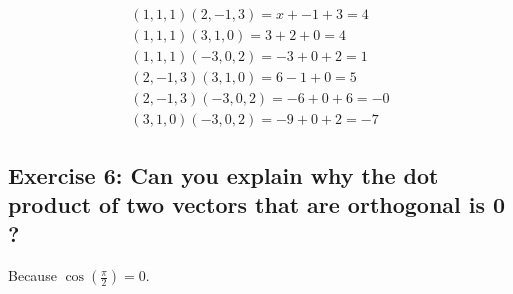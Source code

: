 \documentclass[../main.tex]{subfiles}
\begin{document}
\begin{equation}
\begin{array}{l}
(1,1,1)(2,-1,3)=x+-1+3=4 \\
(1,1,1)(3,1,0)=3+2+0=4 \\
(1,1,1)(-3,0,2)=-3+0+2=1 \\
(2,-1,3)(3,1,0)=6-1+0=5 \\
(2,-1,3)(-3,0,2)=-6+0+6=-0 \\
(3,1,0)(-3,0,2)=-9+0+2=-7
\end{array}
\end{equation}

\subsection*{Exercise 6: Can you explain why the dot product of two vectors
that are orthogonal is 0 ?}

Because $\cos(\frac{\pi}{2}) = 0$.
\end{document}
